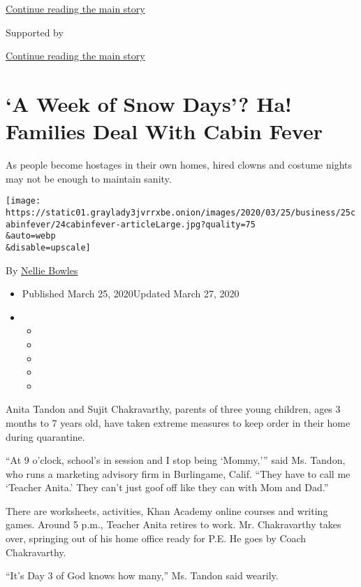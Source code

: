 \protect\hyperlink{after-top}{Continue reading the main story}

Supported by

\protect\hyperlink{after-sponsor}{Continue reading the main story}

\hypertarget{a-week-of-snow-days-ha-families-deal-with-cabin-fever}{%
\section{`A Week of Snow Days'? Ha! Families Deal With Cabin
Fever}\label{a-week-of-snow-days-ha-families-deal-with-cabin-fever}}

As people become hostages in their own homes, hired clowns and costume
nights may not be enough to maintain sanity.

\texttt{[image: https://static01.graylady3jvrrxbe.onion/images/2020/03/25/business/25cabinfever/24cabinfever-articleLarge.jpg?quality=75\\\&auto=webp\\\&disable=upscale]}

By \href{https://www.nytimes3xbfgragh.onion/by/nellie-bowles}{Nellie
Bowles}

\begin{itemize}
\item
  Published March 25, 2020Updated March 27, 2020
\item
  \begin{itemize}
  \item
  \item
  \item
  \item
  \item
  \end{itemize}
\end{itemize}

Anita Tandon and Sujit Chakravarthy, parents of three young children,
ages 3 months to 7 years old, have taken extreme measures to keep order
in their home during quarantine.

``At 9 o'clock, school's in session and I stop being `Mommy,''' said Ms.
Tandon, who runs a marketing advisory firm in Burlingame, Calif. ``They
have to call me `Teacher Anita.' They can't just goof off like they can
with Mom and Dad.''

There are worksheets, activities, Khan Academy online courses and
writing games. Around 5 p.m., Teacher Anita retires to work. Mr.
Chakravarthy takes over, springing out of his home office ready for P.E.
He goes by Coach Chakravarthy.

``It's Day 3 of God knows how many,'' Ms. Tandon said wearily.

